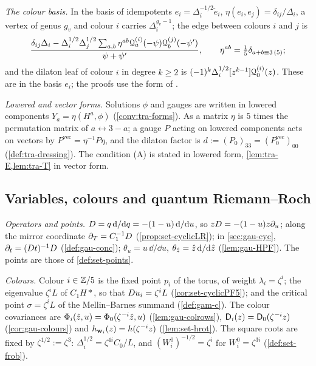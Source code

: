 \emph{The colour basis.} In the basis of idempotents $e_i=\Delta_i^{-1/2}\tilde e_i$, $\eta(e_i,e_j)=\delta_{ij}/\Delta_i$, a vertex of genus $g_v$ and colour $i$ carries $\Delta_i^{g_v-1}$; the edge between colours $i$ and $j$ is
\[
\frac{\delta_{ij}\Delta_i-\Delta_i^{1/2}\Delta_j^{1/2}\sum_{a,b}\eta^{ab}\mathcal{Q}^{(i)}_a(-\psi)\mathcal{Q}^{(j)}_b(-\psi')}{\psi+\psi'},\qquad\eta^{ab}=\tfrac15\delta_{a+b\equiv3\,(5)};
\]
and the dilaton leaf of colour $i$ in degree $k\geq2$ is $(-1)^k\Delta_i^{1/2}[z^{k-1}]\mathcal{Q}^{(i)}_0(z)$. These are \cite[Defs.~2.2, 2.13]{PPZ15} in the basis $e_i$; the proofs use the form of \cite{PPZ15}.

\emph{Lowered and vector forms.} Solutions $\phi$ and gauges are written in lowered components $Y_a=\eta(H^a,\phi)$ (\cref{conv:tra-forms}). As a matrix $\eta$ is $5$ times the permutation matrix of $a\leftrightarrow3-a$; a gauge $P$ acting on lowered components acts on vectors by $P^{\mathrm{vec}}=\eta^{-1}P\eta$, and the dilaton factor is $d:=(P_0)_{33}=(P_0^{\mathrm{vec}})_{00}$ (\cref{def:tra-dressing}). The condition (A) is stated in lowered form, \cref{lem:tra-E,lem:tra-T} in vector form.

\subsection{Variables, colours and quantum Riemann--Roch}
\label{sec:sgn-var}

\emph{Operators and points.} $D=q\,\mathrm{d}/\mathrm{d} q=-(1-u)\,\mathrm{d}/\mathrm{d} u$, so $zD=-(1-u)z\partial_u$; along the mirror coordinate $\partial_T=C_1^{-1}D$ (\cref{prop:set-cyclicLR}); in \cref{sec:gau-cyc}, $\partial_t=(D t)^{-1}D$ (\cref{def:gau-conc}); $\theta_u=u\,\dd/\dd u$, $\theta_{\hat{z}}=\hat{z}\,\mathrm{d}/\mathrm{d}\hat{z}$ (\cref{lem:gau-HPF}). The points are those of \cref{def:set-points}.

\emph{Colours.} Colour $i\in\mathbb{Z}/5$ is the fixed point $p_i$ of the torus, of weight $\lambda_i=\zeta^i$; the eigenvalue $\zeta^iL$ of $C_1H*$, so that $D u_i=\zeta^iL$ (\cref{cor:set-cyclicPF5}); and the critical point $\sigma=\zeta^iL$ of the Mellin--Barnes summand (\cref{def:gam-c}). The colour covariances are $\Phi_i(\hat{z},u)=\Phi_0(\zeta^{-i}\hat{z},u)$ (\cref{lem:gau-colrows}), $\mathsf{D}_i(z)=\mathsf{D}_0(\zeta^{-i}z)$ (\cref{cor:gau-colours}) and $h_{\mathbf{w}_i}(z)=h(\zeta^{-i}z)$ (\cref{lem:set-hrot}). The square roots are fixed by $\zeta^{1/2}:=\zeta^3$: $\Delta_i^{1/2}=\zeta^{4i}C_0/L$, and $(W^0_i)^{-1/2}=\zeta^i$ for $W^0_i=\zeta^{3i}$ (\cref{def:set-frob}).

